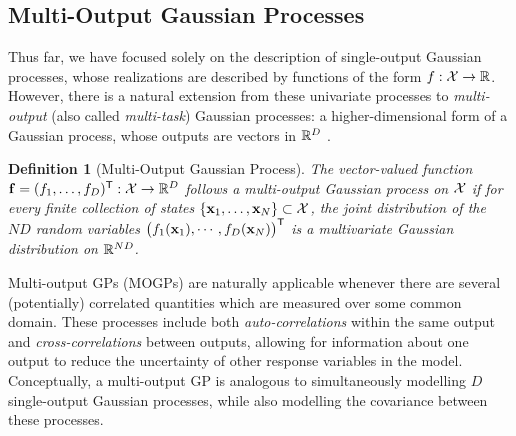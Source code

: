 \documentclass[10pt]{article}
\newtheorem{definition}{Definition}[section]
\numberwithin{equation}{section}
\begin{document}
\subsection{Multi-Output Gaussian Processes}
\label{subsec:intro-MOGP}
Thus far, we have focused solely on the description of single-output Gaussian processes, whose realizations are described by functions of the form $f: \mathcal{X} \to \mathbb{R}$. However, there is a natural extension from these univariate processes to \emph{multi-output} (also called \emph{multi-task}) Gaussian processes: a higher-dimensional form of a Gaussian process, whose outputs are vectors in $\mathbb{R}^{D}$ \citep{Alvarez-Vector-Kernels-2012,Bonilla-Multitask-GP-2007}. 

\begin{definition}[Multi-Output Gaussian Process]
\label{def:MOGP}
    The vector-valued function $\mathbf{f} = (f_{1}, \dots, f_{D})^{\scriptstyle{\mathsf{T}}}: \mathcal{X} \to \mathbb{R}^{D}$ follows a multi-output Gaussian process on $\mathcal{X}$ if for every finite collection of states $\{\mathbf{x}_{1}, \dots, \mathbf{x}_{N}\} \subset \mathcal{X}$, the joint distribution of the $ND$ random variables $\big(f_{1}(\mathbf{x}_{1}), \cdots, f_{D}(\mathbf{x}_{N})\big)^{\scriptstyle{\mathsf{T}}}$ is a multivariate Gaussian distribution on $\mathbb{R}^{ND}$.
\end{definition}

Multi-output GPs (MOGPs) are naturally applicable whenever there are several (potentially) correlated quantities which are measured over some common domain. These processes include both \emph{auto-correlations} within the same output and \emph{cross-correlations} between outputs, allowing for information about one output to reduce the uncertainty of other response variables in the model. Conceptually, a multi-output GP is analogous to simultaneously modelling $D$ single-output Gaussian processes, while also modelling the covariance between these processes.
\end{document}
